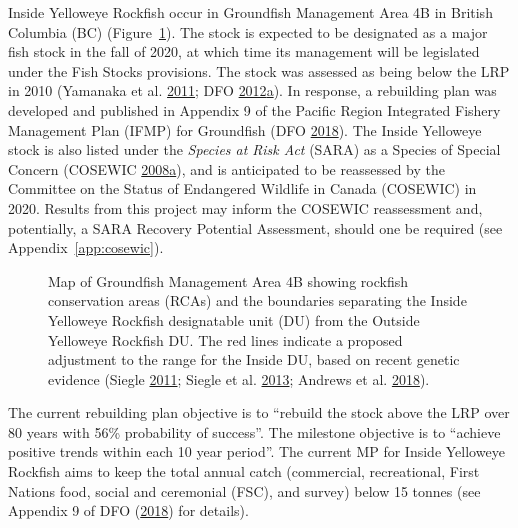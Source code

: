 \documentclass[11pt]{book}
\begin{document}
Inside Yelloweye Rockfish occur in Groundfish Management Area 4B in British Columbia (BC) (Figure~\ref{fig:map-4B}). The stock is expected to be designated as a major fish stock in the fall of 2020, at which time its management will be legislated under the Fish Stocks provisions. The stock was assessed as being below the LRP in 2010 (Yamanaka et al. \protect\hyperlink{ref-yamanaka2011}{2011}; DFO \protect\hyperlink{ref-dfo2012}{2012}\protect\hyperlink{ref-dfo2012}{a}). In response, a rebuilding plan was developed and published in Appendix 9 of the Pacific Region Integrated Fishery Management Plan (IFMP) for Groundfish (DFO \protect\hyperlink{ref-ifmp2018}{2018}). The Inside Yelloweye stock is also listed under the \emph{Species at Risk Act} (SARA) as a Species of Special Concern (COSEWIC \protect\hyperlink{ref-cosewic2008}{2008}\protect\hyperlink{ref-cosewic2008}{a}), and is anticipated to be reassessed by the Committee on the Status of Endangered Wildlife in Canada (COSEWIC) in 2020. Results from this project may inform the COSEWIC reassessment and, potentially, a SARA Recovery Potential Assessment, should one be required (see Appendix~\ref{app:cosewic}).


\begin{figure}[htb]

{\centering {} 

}

\caption{Map of Groundfish Management Area 4B showing rockfish conservation areas (RCAs) and the boundaries separating the Inside Yelloweye Rockfish designatable unit (DU) from the Outside Yelloweye Rockfish DU. The red lines indicate a proposed adjustment to the range for the Inside DU, based on recent genetic evidence (Siegle \protect\hyperlink{ref-siegle2011}{2011}; Siegle et al. \protect\hyperlink{ref-siegle2013}{2013}; Andrews et al. \protect\hyperlink{ref-andrews2018}{2018}).}\label{fig:map-4B}
\end{figure}
The current rebuilding plan objective is to ``rebuild the stock above the LRP over 80 years with 56\% probability of success''. The milestone objective is to ``achieve positive trends within each 10 year period''. The current MP for Inside Yelloweye Rockfish aims to keep the total annual catch (commercial, recreational, First Nations food, social and ceremonial (FSC), and survey) below 15 tonnes (see Appendix 9 of DFO (\protect\hyperlink{ref-ifmp2018}{2018}) for details).
\end{document}
